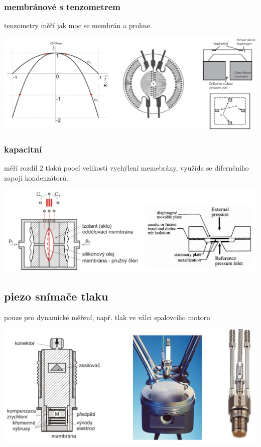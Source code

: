 \subsubsection*{membránové s tenzometrem}
tenzometry měří jak moc se membrán a prohne.

\includegraphics*[scale =0.2]{img/tlak_membrana.png}


\subsubsection*{kapacitní}
měří rozdíl 2 tlaků poocí velikosti vychýlení memebrány, využída se difernčního zapojí kondenzátorů.

\includegraphics*[scale = 0.5]{img/tlak_kapacita.png}

\subsection*{piezo snímače tlaku}
pouze pro dynamické měření, např. tlak ve válci spalovcího motoru

\includegraphics*[scale = 0.2]{img/tlak_piezo.png}
